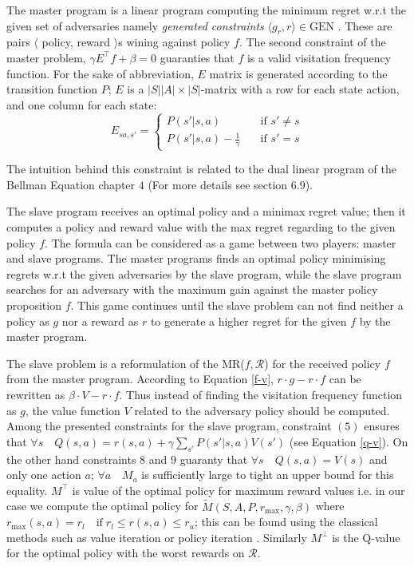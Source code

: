 \documentclass[runningheads,a4paper]{llncs}
\begin{document}
The master program is a linear program computing the minimum regret w.r.t the given set of adversaries namely \textit{generated constraints} $\langle g_r, r \rangle \in \text{GEN}$ \citep{Regan2009}. These are pairs $\langle$ policy, reward $\rangle$s wining against policy $f$. The second constraint of the master problem, $\gamma E ^{\top}f+ \beta = 0$ guaranties that $f$ is a valid visitation frequency function. For the sake of abbreviation, $E$ matrix is generated according to the transition function $P$; $E$ is a $|S||A| \times |S|$-matrix with a row for each state action, and one column for each state:
\[   
E_{sa,s'} = 
     \begin{cases}
       P(s'|s, a) &\quad \text{if } s' \neq s\\
       P(s'|s, a) - \frac{1}{\gamma} &\quad \text{if } s' = s
     \end{cases}
\] 

The intuition behind this constraint is related to the dual linear program of the Bellman Equation \cite{Sutton1998} chapter $4$ (For more details see \citep{Puterman1994} section $6.9$). 

The slave program receives an optimal policy and a minimax regret value; then it computes a policy and reward value with the max regret regarding to the given policy $f$. The formula can be considered as a game between two players: master and slave programs. The master programs finds an optimal policy minimising regrets w.r.t the given adversaries by the slave program, while the slave program searches for an adversary with the maximum gain against the master policy proposition $f$. This game continues until the slave problem can not find neither a policy as $g$ nor a reward as $r$ to generate a higher regret for the given $f$ by the master program.  

The slave problem is a reformulation of the MR($f, \mathcal{R}$) for the received policy $f$ from the master program. According to Equation \ref{f-v}, $r \cdot g - r \cdot f$ can be rewritten as $\beta \cdot V - r \cdot f$. Thus instead of finding the visitation frequency function as $g$, the value function $V$ related to the adversary policy should be computed. Among the presented constraints for the slave program, constraint $(5)$ ensures that $\forall s \quad Q(s, a) = r(s,a) + \gamma \sum_{s'} P(s'|s,a)V(s')$ (see Equation \ref{q-v}). On the other hand constraints $8$ and $9$ guaranty that $\forall s \quad Q(s, a) = V(s)$ and only one action $a$; $\forall a \quad M_a$ is sufficiently large to tight an upper bound for this equality. $M^{\top}$ is value of the optimal policy for maximum reward values i.e. in our case we compute the optimal policy for $\tilde{M}(S, A, P, r_{\text{max}}, \gamma, \beta)$ where $r_{\text{max}}(s, a) = r_l \quad \text{if} \; r_l \leq r(s, a) \leq r_u$; this can be found using the classical methods such as value iteration or policy iteration \cite{Sutton1998}. Similarly $M^{\perp}$ is the Q-value for the optimal policy with the worst rewards on $\mathcal{R}$. 
\end{document}
